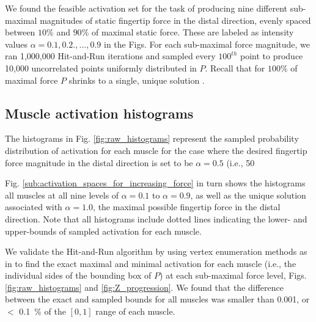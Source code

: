 We found the feasible activation set for the task of producing nine different sub-maximal magnitudes of static fingertip force in the distal direction, evenly spaced between  $10\%$ and $90\%$ of maximal static force. These are labeled as intensity values $\alpha = 0.1, 0.2., \hdots, 0.9$ in the Figs.  For each sub-maximal force magnitude, we ran 1,000,000 Hit-and-Run iterations and sampled every $100^{th}$ point to produce 10,000 uncorrelated points uniformly distributed in $P$. Recall that for $100\%$ of maximal force $P$ shrinks to a single, unique solution \cite{valero-cuevas2007large}.

\subsection*{Muscle activation histograms}

The histograms in Fig. \ref{fig:raw_histograms} represent the sampled probability distribution of activation for each muscle for the case where the desired fingertip force magnitude in the distal direction is  set to be $\alpha = 0.5$ (i.e., 50%

Fig. \ref{sub:activation_spaces_for_increasing_force} in turn shows  the histograms  all muscles at all nine levels of $\alpha = 0.1$ to $\alpha = 0.9$, as well as the unique solution associated with $\alpha = 1.0$, the  maximal possible  fingertip force in the distal direction. Note that  all histograms include dotted lines indicating the lower- and upper-bounds of sampled activation for each muscle. 

We  validate the Hit-and-Run algorithm by using vertex enumeration methods as in \cite{Valero-Cuevas1998Large,Valero-Cuevas2000Predictive} to find the exact maximal and minimal activation for each muscle (i.e., the individual sides of the bounding box of $P$) at each sub-maximal force level, Figs. \ref{fig:raw_histograms} and \ref{fig:Z_progression}. We found that the difference between the exact and sampled bounds for all muscles was smaller than 0.001, or $<$ 0.1~\% of the $[0, 1]$ range of each muscle. 

